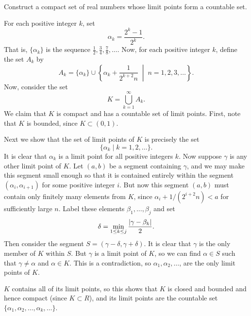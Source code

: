  Construct a compact set of real numbers whose limit
points form a countable set.
\begin{solution}
  For each positive integer $k$, set
  \begin{equation*}
    \alpha_k = \frac{2^k - 1}{2^k}.
  \end{equation*}
  That is, $\{\alpha_k\}$ is the sequence
  $\frac12, \frac34, \frac78, \dots$. Now, for each positive integer
  $k$, define the set $A_k$ by
  \begin{equation*}
    A_k = \{\alpha_k\} \cup \left\{ \alpha_k + \frac1{2^{k+2}n}
      \;\middle|\; n = 1, 2, 3, \dots \right\}.
  \end{equation*}
  Now, consider the set
  \begin{equation*}
    K = \bigcup_{k=1}^\infty A_k.
  \end{equation*}
  We claim that $K$ is compact and has a countable set of limit
  points. First, note that $K$ is bounded, since $K\subset(0,1)$.

  Next we show that the set of limit points of $K$ is precisely the
  set
  \begin{equation*}
    \{\alpha_k \mid k = 1,2,\dots\}.
  \end{equation*}
  It is clear that $\alpha_k$ is a limit point for all positive
  integers $k$. Now suppose $\gamma$ is any other limit point of
  $K$. Let $(a,b)$ be a segment containing $\gamma$, and we may make
  this segment small enough so that it is contained entirely within
  the segment $(\alpha_i,\alpha_{i+1})$ for some positive integer
  $i$. But now this segment $(a,b)$ must contain only finitely many
  elements from $K$, since $\alpha_i + 1/(2^{i+2}n) < a$ for
  sufficiently large $n$. Label these elements $\beta_1,\dots,\beta_j$
  and set
  \begin{equation*}
    \delta = \min_{1\leq k\leq j}\frac{\lvert{\gamma - \beta_k}\rvert}2.
  \end{equation*}
  Then consider the segment $S = (\gamma - \delta, \gamma +
  \delta)$. It is clear that $\gamma$ is the only member of $K$ within
  $S$.  But $\gamma$ is a limit point of $K$, so we can find
  $\alpha\in S$ such that $\gamma\neq\alpha$ and $\alpha\in K$. This
  is a contradiction, so $\alpha_1,\alpha_2,\dots$, are the only limit
  points of $K$.

  $K$ contains all of its limit points, so this shows that $K$ is
  closed and bounded and hence compact (since $K\subset R$), and its
  limit points are the countable set
  $\{\alpha_1,\alpha_2,\dots,\alpha_k,\dots\}$.
\end{solution}
